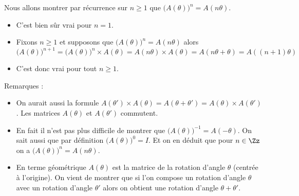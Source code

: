 {{\bigskip

Nous allons montrer par récurrence sur $n\ge 1$ que $\big(A(\theta)\big)^n = A(n\theta)$.

\begin{itemize}
  \item C'est bien sûr vrai pour $n=1$.
  \item Fixons $n\ge 1$ et supposons que $\big(A(\theta)\big)^n = A(n\theta)$ alors
$$\big(A(\theta)\big)^{n+1} = \big(A(\theta)\big)^n \times A(\theta) = A(n\theta) \times A(\theta) = A(n\theta+\theta) = A((n+1)\theta)$$
  \item C'est donc vrai pour tout $n\ge 1$.
\end{itemize}


Remarques :
\begin{itemize}
  \item On aurait aussi la formule $A(\theta')\times A(\theta) = A(\theta+\theta') = A(\theta)\times A(\theta')$.
Les matrices $A(\theta)$ et $A(\theta')$ commutent.

  \item En fait il n'est pas plus difficile de montrer que $\big(A(\theta)\big)^{-1}=A(-\theta)$.
On sait aussi que par définition $\big(A(\theta)\big)^{0}=I$. Et on en déduit que pour $n\in \Zz$ on a 
$\big(A(\theta)\big)^n = A(n\theta)$.

  \item En terme géométrique $A(\theta)$ est la matrice de la rotation d'angle $\theta$ (centrée à l'origine).
On vient de montrer que si l'on compose un rotation d'angle $\theta$ avec un rotation d'angle $\theta'$
alors on obtient une rotation d'angle $\theta+\theta'$.
\end{itemize}
}
}
